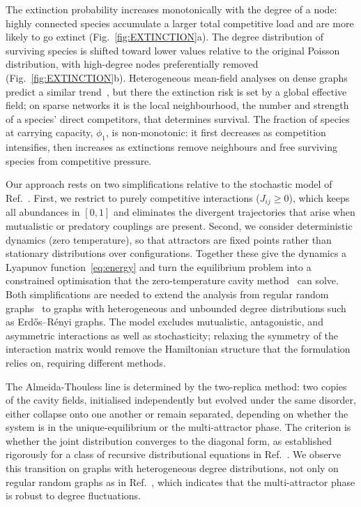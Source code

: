 \documentclass[11pt,a4paper]{article}
\begin{document}
The extinction probability increases monotonically with the degree of a node: highly connected species accumulate a larger total competitive load and are more likely to go extinct (Fig.~\ref{fig:EXTINCTION}a).  The degree distribution of surviving species is shifted toward lower values relative to the original Poisson distribution, with high-degree nodes preferentially removed (Fig.~\ref{fig:EXTINCTION}b).  Heterogeneous mean-field analyses on dense graphs predict a similar trend~\cite{poley2025}, but there the extinction risk is set by a global effective field; on sparse networks it is the local neighbourhood, the number and strength of a species' direct competitors, that determines survival. The fraction of species at carrying capacity, $\phi_1$, is non-monotonic: it first decreases as competition intensifies, then increases as extinctions remove neighbours and free surviving species from competitive pressure.

Our approach rests on two simplifications relative to the stochastic model of Ref.~\cite{tonolo2025generalized}.  First, we restrict to purely competitive interactions ($J_{ij}\geq 0$), which keeps all abundances in $[0,1]$ and eliminates the divergent trajectories that arise when mutualistic or predatory couplings are present.  Second, we consider deterministic dynamics (zero temperature), so that attractors are fixed points rather than stationary distributions over configurations.  Together these give the dynamics a Lyapunov function~\eqref{eq:energy} and turn the equilibrium problem into a constrained optimisation that the zero-temperature cavity method~\cite{mezard2003cavity} can solve.  Both simplifications are needed to extend the analysis from regular random graphs~\cite{stav2022,tonolo2025generalized} to graphs with heterogeneous and unbounded degree distributions such as Erd\H{o}s--R\'{e}nyi graphs.  The model excludes mutualistic, antagonistic, and asymmetric interactions as well as stochasticity; relaxing the symmetry of the interaction matrix would remove the Hamiltonian structure that the formulation relies on, requiring different methods.

The Almeida-Thouless line is determined by the two-replica method: two copies of the cavity fields, initialised independently but evolved under the same disorder, either collapse onto one another or remain separated, depending on whether the system is in the unique-equilibrium or the multi-attractor phase.  The criterion is whether the joint distribution converges to the diagonal form, as established rigorously for a class of recursive distributional equations in Ref.~\cite{aldous2005survey}. We observe this transition on graphs with heterogeneous degree distributions, not only on regular random graphs as in Ref.~\cite{tonolo2025generalized}, which indicates that the multi-attractor phase is robust to degree fluctuations.
\end{document}
